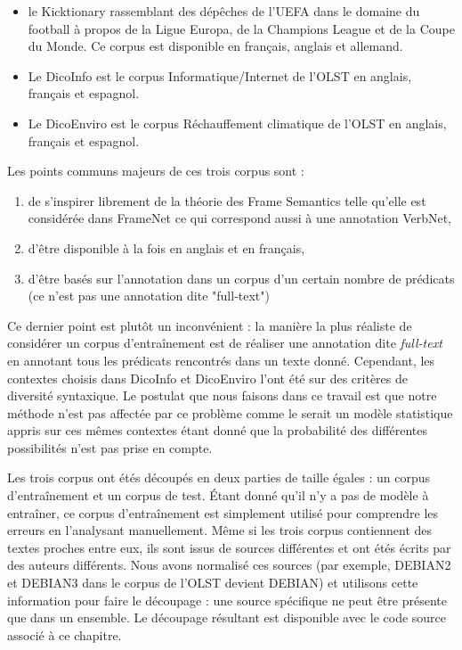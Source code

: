 \begin{itemize}

    \item le Kicktionary \citep{schmidt2009kicktionary} rassemblant des
        dépêches de l'UEFA dans le domaine du football à propos de la Ligue
        Europa, de la Champions League et de la Coupe du Monde. Ce corpus est
        disponible en français, anglais et allemand.

    \item Le DicoInfo est le corpus Informatique/Internet de l'OLST
        \citep{corpusolst} en anglais, français et espagnol.

    \item Le DicoEnviro est le corpus Réchauffement climatique de l'OLST
        \citep{corpusolst} en anglais, français et espagnol.

\end{itemize}

Les points communs majeurs de ces trois corpus sont :
\begin{enumerate}

    \item de s'inspirer librement de la théorie des Frame Semantics telle
        qu'elle est considérée dans FrameNet ce qui correspond aussi à une
        annotation VerbNet,

    \item d'être disponible à la fois en anglais et en français,

    \item d'être basés sur l'annotation dans un corpus d'un certain nombre de
        prédicats (ce n'est pas une annotation dite "full-text")

\end{enumerate}

Ce dernier point est plutôt un inconvénient : la manière la plus réaliste de
considérer un corpus d'entraînement est de réaliser une annotation dite
\textit{full-text} en annotant tous les prédicats rencontrés dans un texte
donné. Cependant, les contextes choisis dans DicoInfo et DicoEnviro l'ont été
sur des critères de diversité syntaxique. \citep{lhomme2012adding} Le postulat
que nous faisons dans ce travail est que notre méthode n'est pas affectée par
ce problème comme le serait un modèle statistique appris sur ces mêmes
contextes étant donné que la probabilité des différentes possibilités n'est pas
prise en compte.

Les trois corpus ont étés découpés en deux parties de taille égales : un corpus
d'entraînement et un corpus de test. Étant donné qu'il n'y a pas de modèle à
entraîner, ce corpus d'entraînement est simplement utilisé pour comprendre les
erreurs en l'analysant manuellement. Même si les trois corpus contiennent des
textes proches entre eux, ils sont issus de sources différentes et ont étés
écrits par des auteurs différents. Nous avons normalisé ces sources (par
exemple, DEBIAN2 et DEBIAN3 dans le corpus de l'OLST devient DEBIAN) et
utilisons cette information pour faire le découpage : une source spécifique ne
peut être présente que dans un ensemble. Le découpage résultant est disponible
avec le code source associé à ce chapitre.

